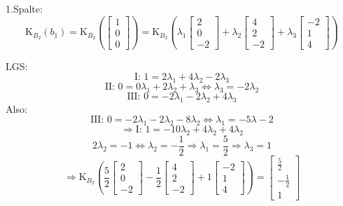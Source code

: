 \documentclass[a4paper, 11pt]{article}
\begin{document}
1.Spalte:
$$ \text{K}_{B_2}(b_1) =  \text{K}_{B_2}\left(\begin{bmatrix} 1 \\ 0 \\ 0 \end{bmatrix}\right)
= \text{K}_{B_2}\left(\lambda_1\begin{bmatrix} 2 \\ 0 \\ -2 \end{bmatrix} +
    \lambda_2\begin{bmatrix} 4 \\ 2 \\ -2 \end{bmatrix} +
    \lambda_3\begin{bmatrix} -2 \\ 1 \\ 4 \end{bmatrix}\right) $$

LGS:
$$\text{I: } 1 = 2\lambda_1 + 4\lambda_2 - 2\lambda_3 $$
$$\text{II: } 0 = 0\lambda_1 + 2\lambda_2 + \lambda_3 \Leftrightarrow \lambda_3 = -2\lambda_2 $$
$$\text{III: } 0 = -2\lambda_1 - 2\lambda_2 + 4\lambda_3 $$
Also:
$$\text{III: } 0 = -2\lambda_1 - 2\lambda_2 - 8\lambda_2 \Leftrightarrow \lambda_1 = -5\lambda-2$$
$$\Rightarrow \text{I: } 1 = -10\lambda_2 + 4\lambda_2 + 4\lambda_2$$
$$2\lambda_2 = -1 \Leftrightarrow \lambda_2 = -\frac{1}{2} \Rightarrow \lambda_1 = \frac{5}{2} \Rightarrow \lambda_3 = 1$$
$$\Rightarrow \text{K}_{B_2}\left(\frac{5}{2}\begin{bmatrix} 2 \\ 0 \\ -2   \end{bmatrix} -
    \frac{1}{2}\begin{bmatrix} 4 \\ 2 \\ -2 \end{bmatrix} +
    1\begin{bmatrix} -2 \\ 1 \\ 4 \end{bmatrix}\right) =
\begin{bmatrix} \frac{5}{2} \\ -\frac{1}{2} \\ 1 \end{bmatrix}$$
\end{document}
